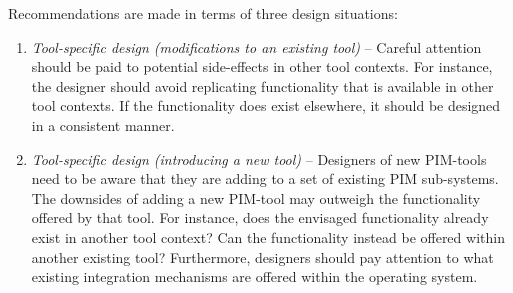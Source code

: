 Recommendations are made in terms of three design situations:

\begin{enumerate}

\item \textit{Tool-specific design (modifications to an existing tool)} -- Careful attention should be paid to potential side-effects in other tool contexts.  For instance, the designer should avoid replicating functionality that is available in other tool contexts.  If the functionality does exist elsewhere, it should be designed in a consistent manner.

\item \textit{Tool-specific design (introducing a new tool)} -- Designers of new PIM-tools need to be aware that they are adding to a set of existing PIM sub-systems. The downsides of adding a new PIM-tool may outweigh the functionality offered by that tool.  For instance, does the envisaged functionality already exist in another tool context?  Can the functionality instead be offered within another existing tool?  Furthermore, designers should pay attention to what existing integration mechanisms are offered within the operating system.  %


\end{enumerate}

